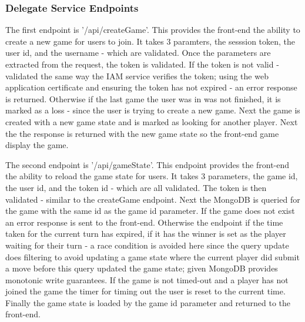 \documentclass[12pt]{article}
\begin{document}
\subsubsection{Delegate Service Endpoints}
The first endpoint is '/api/createGame'. This provides the front-end the ability to create a new game for users to join. It takes 3 paramters, the sesssion token, the user id, and the username - which are validated. Once the parameters are extracted from the request, the token is validated. If the token is not valid - validated the same way the IAM service verifies the token; using the web application certificate and ensuring the token has not expired - an error response is returned. Otherwise if the last game the user was in was not finished, it is marked as a loss - since the user is trying to create a new game. Next the game is created with a new game state and is marked as looking for another player. Next the the response is returned with the new game state so the front-end game display the game.

The second endpoint is '/api/gameState'. This endpoint provides the front-end the ability to reload the game state for users. It takes 3 parameters, the game id, the user id, and the token id - which are all validated. The token is then validated - similar to the createGame endpoint. Next the MongoDB is queried for the game with the same id as the game id parameter. If the game does not exist an error response is sent to the front-end. Otherwise the endpoint if the time taken for the current turn has expired, if it has the winner is set as the player waiting for their turn - a race condition is avoided here since the query update does filtering to avoid updating a game state where the current player did submit a move before this query updated the game state; given MongoDB provides monotonic write guarantees. If the game is not timed-out and a player has not joined the game the timer for timing out the user is reset to the current time. Finally the game state is loaded by the game id parameter and returned to the front-end.
\end{document}
